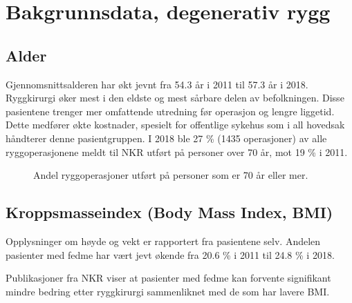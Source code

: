 \documentclass [norsk,a4paper,twoside]{article}\usepackage[]{graphicx}\usepackage[]{color}
\begin{document}
\clearpage



\section{Bakgrunnsdata, degenerativ rygg}


\subsection{Alder}




Gjennomsnittsalderen har økt jevnt fra 54.3 år 
i 2011 til 57.3 år i 2018. 
Ryggkirurgi øker mest i den eldste og mest sårbare delen av
befolkningen. Disse pasientene trenger mer omfattende utredning før operasjon og
lengre liggetid. Dette medfører økte kostnader, spesielt for offentlige sykehus som i
all hovedsak håndterer denne pasientgruppen. I 2018 ble 27 \% 
(1435 
operasjoner) av alle
ryggoperasjonene meldt til NKR utført på personer over 70 år, mot 19 \% 
i 2011. 

\begin{figure}[ht]
\caption{\label{fig:Alder70} Andel ryggoperasjoner utført på personer som er 70 år eller mer.}
\end{figure}





\subsection{Kroppsmasseindex (Body Mass Index, BMI)}



Opplysninger om høyde og vekt er rapportert fra pasientene selv.
Andelen pasienter med fedme har vært jevt økende fra 
20.6 \% 
i 2011
til 24.8 \%
i  2018.

Publikasjoner fra NKR viser at pasienter med fedme kan forvente signifikant mindre bedring etter 
ryggkirurgi sammenliknet med de som har lavere BMI. 
\end{document}
